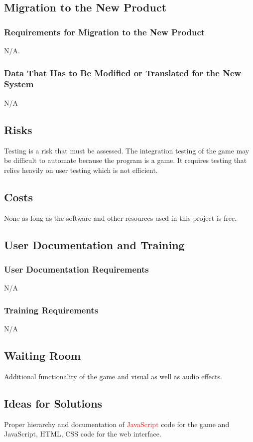 \documentclass[12pt, titlepage]{article}
\begin{document}
\subsection{Migration to the New Product}
\subsubsection{Requirements for Migration to the New Product}
N/A.
\subsubsection{Data That Has to Be Modified or Translated for the New System}
N/A
\subsection{Risks}
Testing is a risk that must be assessed. The integration testing of the game may be difficult to automate because the program is a game. It requires testing that relies heavily on user testing which is not efficient.
\subsection{Costs}
None as long as the software and other resources used in this project is free.
\subsection{User Documentation and Training}
\subsubsection{User Documentation Requirements}
N/A
\subsubsection{Training Requirements}
N/A

\subsection{Waiting Room}
Additional functionality of the game and visual as well as audio effects.

\subsection{Ideas for Solutions}
Proper hierarchy and documentation of \textcolor{red}{JavaScript} code for the game and JavaScript, HTML, CSS code for the web interface.
\end{document}
